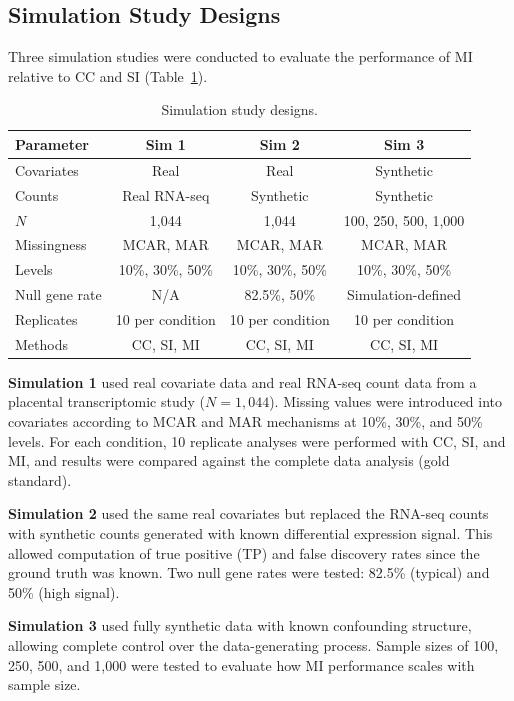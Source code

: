 \documentclass[11pt]{article}
\begin{document}
\subsection{Simulation Study Designs}

Three simulation studies were conducted to evaluate the performance of MI relative to CC and SI (Table~\ref{tab:simdesign}).

\begin{table}[h]
\centering
\caption{Simulation study designs.}
\label{tab:simdesign}
\begin{tabular}{lccc}
\toprule
Parameter & Sim 1 & Sim 2 & Sim 3 \\
\midrule
Covariates & Real & Real & Synthetic \\
Counts & Real RNA-seq & Synthetic & Synthetic \\
$N$ & 1,044 & 1,044 & 100, 250, 500, 1,000 \\
Missingness & MCAR, MAR & MCAR, MAR & MCAR, MAR \\
Levels & 10\%, 30\%, 50\% & 10\%, 30\%, 50\% & 10\%, 30\%, 50\% \\
Null gene rate & N/A & 82.5\%, 50\% & Simulation-defined \\
Replicates & 10 per condition & 10 per condition & 10 per condition \\
Methods & CC, SI, MI & CC, SI, MI & CC, SI, MI \\
\bottomrule
\end{tabular}
\end{table}

\textbf{Simulation 1} used real covariate data and real RNA-seq count data from a placental transcriptomic study ($N = 1{,}044$). Missing values were introduced into covariates according to MCAR and MAR mechanisms at 10\%, 30\%, and 50\% levels. For each condition, 10 replicate analyses were performed with CC, SI, and MI, and results were compared against the complete data analysis (gold standard).

\textbf{Simulation 2} used the same real covariates but replaced the RNA-seq counts with synthetic counts generated with known differential expression signal. This allowed computation of true positive (TP) and false discovery rates since the ground truth was known. Two null gene rates were tested: 82.5\% (typical) and 50\% (high signal).

\textbf{Simulation 3} used fully synthetic data with known confounding structure, allowing complete control over the data-generating process. Sample sizes of 100, 250, 500, and 1,000 were tested to evaluate how MI performance scales with sample size.
\end{document}
